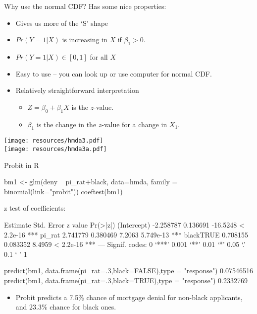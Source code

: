 \documentclass[aspectratio=169]{beamer}
\begin{document}
\begin{frame}{Why use the normal CDF?}
Has some nice properties:
\begin{itemize}
\item Gives us more of the `S' shape
\item $Pr(Y=1|X)$ is increasing in $X$ if $\beta_1>0$.
\item $Pr(Y=1|X) \in [0,1]$ for all $X$
\item Easy to use -- you can look up or use computer for normal CDF.
\item Relatively straightforward interpretation
\begin{itemize}
\item $Z=\beta_0 + \beta_1 X$ is the $z$-value.
\item $\beta_1$ is the change in the $z$-value for a change in $X_1$.
\end{itemize}
\end{itemize}
\end{frame}

\begin{frame}
\begin{center}
\texttt{[image: resources/hmda3.pdf]}\\
\texttt{[image: resources/hmda3a.pdf]}\\
\end{center}
\end{frame}

\begin{frame}[fragile]{Probit in R}
\footnotesize
\begin{semiverbatim}
bm1 <- glm(deny ~ pi_rat+black, data=hmda, family = binomial(link="probit"))
coeftest(bm1)

z test of coefficients:

             Estimate Std. Error  z value  Pr(>|z|)    
(Intercept) -2.258787   0.136691 -16.5248 < 2.2e-16 ***
pi_rat       2.741779   0.380469   7.2063 5.749e-13 ***
blackTRUE    0.708155   0.083352   8.4959 < 2.2e-16 ***
---
    Signif. codes:  0 `***' 0.001 `**' 0.01 `*' 0.05 `.' 0.1 ` ' 1

predict(bm1, data.frame(pi_rat=.3,black=FALSE),type = "response")
    0.07546516
predict(bm1, data.frame(pi_rat=.3,black=TRUE),type = "response")
    0.2332769
\end{semiverbatim}
\begin{itemize}
\item Probit predicts a 7.5\% chance of mortgage denial for non-black applicants, and 23.3\% chance for black ones.
\end{itemize}
\end{frame}
\end{document}
